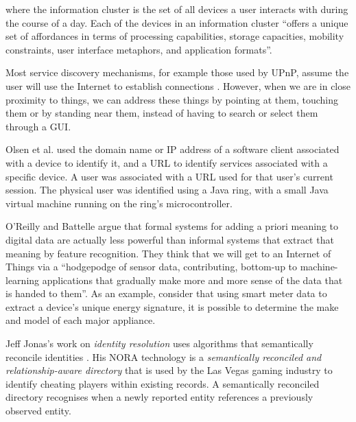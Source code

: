 where the information cluster is the set of all devices a user interacts with during the course of a day. Each of the devices in an information cluster ``offers a unique set of affordances in terms of processing capabilities, storage capacities, mobility constraints, user interface metaphors, and application formats''.

Most service discovery mechanisms, for example those used by \ac{UPnP}, assume the user will use the Internet to establish connections \cite{Jeronimo2009}. However, when we are in close proximity to things, we can address these things by pointing at them, touching them or by standing near them, instead of having to search or select them through a \ac{GUI}.

Olsen et al. \cite{Olsen2001} used the domain name or IP address of a software client associated with a device to identify it, and a URL to identify services associated with a specific device. A user was associated with a URL used for that user's current session. The physical user was identified using a Java ring, with a small Java virtual machine running on the ring's microcontroller. 




O'Reilly and Battelle \cite{OReilly2009} argue that formal systems for adding a priori meaning to digital data are actually less powerful than informal systems that extract that meaning by feature recognition. They think that we will get to an Internet of Things via a ``hodgepodge of sensor data, contributing, bottom-up to machine-learning applications that gradually make more and more sense of the data that is handed to them''. As an example, consider that using smart meter data to extract a device's unique energy signature, it is possible to determine the make and model of each major appliance.

Jeff Jonas's work on \emph{identity resolution} uses algorithms that semantically reconcile identities \cite{Segaran2009}. His \ac{NORA} technology is a \emph{semantically reconciled and relationship-aware directory} that is used by the Las Vegas gaming industry to identify cheating players within existing records. A semantically reconciled directory recognises when a newly reported entity references a previously observed entity.

